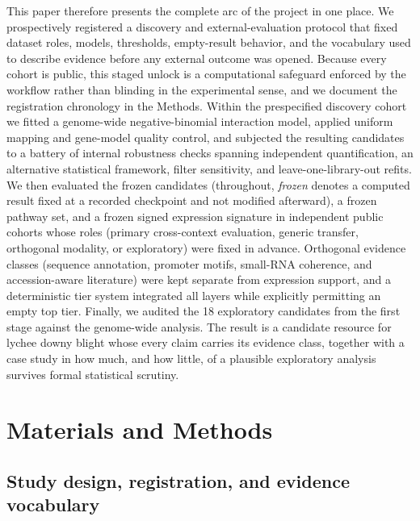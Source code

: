 \documentclass[12pt,letterpaper]{article}
\begin{document}
This paper therefore presents the complete arc of the project in one place. We prospectively registered a discovery and external-evaluation protocol that fixed dataset roles, models, thresholds, empty-result behavior, and the vocabulary used to describe evidence before any external outcome was opened. Because every cohort is public, this staged unlock is a computational safeguard enforced by the workflow rather than blinding in the experimental sense, and we document the registration chronology in the Methods. Within the prespecified discovery cohort we fitted a genome-wide negative-binomial interaction model, applied uniform mapping and gene-model quality control, and subjected the resulting candidates to a battery of internal robustness checks spanning independent quantification, an alternative statistical framework, filter sensitivity, and leave-one-library-out refits. We then evaluated the frozen candidates (throughout, \textit{frozen} denotes a computed result fixed at a recorded checkpoint and not modified afterward), a frozen pathway set, and a frozen signed expression signature in independent public cohorts whose roles (primary cross-context evaluation, generic transfer, orthogonal modality, or exploratory) were fixed in advance. Orthogonal evidence classes (sequence annotation, promoter motifs, small-RNA coherence, and accession-aware literature) were kept separate from expression support, and a deterministic tier system integrated all layers while explicitly permitting an empty top tier. Finally, we audited the 18 exploratory candidates from the first stage against the genome-wide analysis. The result is a candidate resource for lychee downy blight whose every claim carries its evidence class, together with a case study in how much, and how little, of a plausible exploratory analysis survives formal statistical scrutiny.

\section*{Materials and Methods}

\subsection*{Study design, registration, and evidence vocabulary}
\end{document}

